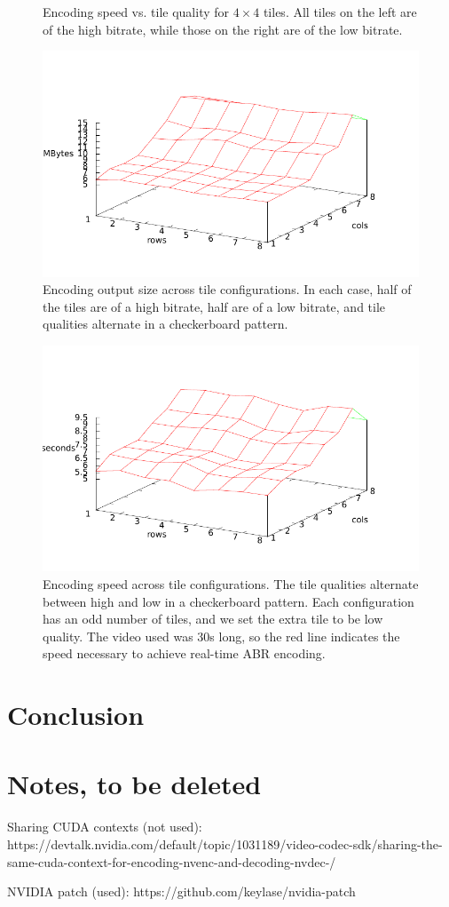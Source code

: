 \begin{figure}[t]
	\caption{Encoding speed vs. tile quality for $4\times4$ tiles. All tiles on the left are of the high bitrate, while those on the right are of the low bitrate.}
\end{figure}

\begin{figure}[t]
	\includegraphics[width=\columnwidth]{figures/Sizes.pdf}
	\caption{Encoding output size across tile configurations. In each case, half of the tiles are of a high bitrate, half are of a low bitrate, and tile qualities alternate in a checkerboard pattern.}
\end{figure}

\begin{figure}[t]
	\includegraphics[width=\columnwidth]{figures/Times.pdf}
	\caption{Encoding speed across tile configurations. The tile qualities alternate between high and low in a checkerboard pattern. Each configuration has an odd number of tiles, and we set the extra tile to be low quality. The video used was 30s long, so the red line indicates the speed necessary to achieve real-time ABR encoding.}
\end{figure}


\section{Conclusion}

\section{Notes, to be deleted}
Sharing CUDA contexts (not used): https://devtalk.nvidia.com/default/topic/1031189/video-codec-sdk/sharing-the-same-cuda-context-for-encoding-nvenc-and-decoding-nvdec-/

NVIDIA patch (used): https://github.com/keylase/nvidia-patch
